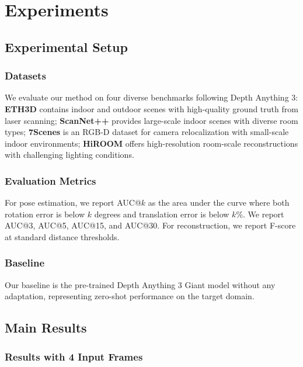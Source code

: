 \section{Experiments}
\label{sec:experiments}

\subsection{Experimental Setup}

\subsubsection{Datasets}

We evaluate our method on four diverse benchmarks following Depth Anything 3: \textbf{ETH3D} contains indoor and outdoor scenes with high-quality ground truth from laser scanning; \textbf{ScanNet++} provides large-scale indoor scenes with diverse room types; \textbf{7Scenes} is an RGB-D dataset for camera relocalization with small-scale indoor environments; \textbf{HiROOM} offers high-resolution room-scale reconstructions with challenging lighting conditions.

\subsubsection{Evaluation Metrics}

For pose estimation, we report AUC@$k$ as the area under the curve where both rotation error is below $k$ degrees and translation error is below $k$\%. We report AUC@3, AUC@5, AUC@15, and AUC@30. For reconstruction, we report F-score at standard distance thresholds.

\subsubsection{Baseline}

Our baseline is the pre-trained Depth Anything 3 Giant model without any adaptation, representing zero-shot performance on the target domain.

\subsection{Main Results}

\subsubsection{Results with 4 Input Frames}

